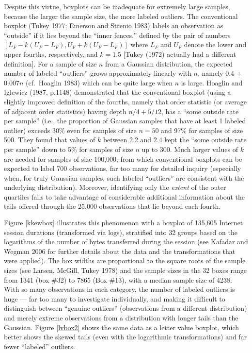 \documentclass[11pt]{article}
\begin{document}
Despite this virtue, boxplots can be inadequate for 
extremely large samples, because the larger the sample 
size, the more labeled outliers.
The conventional boxplot (Tukey 1977; Emerson and Strenio
1983) labels an observation as ``outside'' if it lies 
beyond the ``inner fences,'' defined by the pair of 
numbers $[L_F - k(U_F - L_F), U_F + k(U_F - L_F)]$ 
where $L_F$ and $U_F$ denote the lower and upper
fourths, respectively, and $k = 1.5$ [Tukey (1972)
actually had a different definition].
For a sample of size $n$ from a Gaussian distribution,
the expected number of labeled ``outliers'' grows 
approximately linearly with $n$, namely 
0.4 + 0.007$n$ 
(cf.~Hoaglin 1983) %
which can be quite large when $n$ is large.  
Hoaglin and Iglewicz (1987, p.1148) demonstrated that the
conventional boxplot (using a slightly improved definition
of the fourths, namely that order statistic (or average of
adjacent order statistics) having depth $n/4 + 5/12$,
has a ``some outside rate per sample'' (i.e., the proportion
of Gaussian samples that have at least 1 labeled outlier) 
exceeds 30\% even for samples of size $n = 50$ and 97\%
for samples of size 500.
They found that values of $k$ between 2.2 and 2.4 kept the
``some outside rate per sample'' down to 5\% for samples
of size $n$ up to 300. 
Much larger values of $k$ are needed for samples of size 
100,000, from which conventional boxplots can be expected to
label 700 observations, far too many for detailed inquiry 
(especially when, for truly Gaussian samples, such labeled 
``outliers'' are consistent with the underlying distribution).
Moreover, identifying only the \textit{extent} of the outer
quartiles fails to take advantage of considerable additional
information about the tails offered through the 25,000 
observations that lie beyond each fourth.

Figure \ref{kkewbox} illustrates this phenomenon with a boxplot 
of 135,605 Internet session durations (transformed via logs), 
stratified into 32 groups based on the logarithms of the number 
of bytes transferred during the session (see Kafadar and Wegman 2006
for further details about the data and the transformations
that were applied).  The box widths are proportional to the
square roots of the sample sizes (see Larsen, McGill, Tukey
1978) and the sample sizes in the 32 boxes range from 1341
(box \#32) to 7865 (Box \#13), with a median sample size 
of 4238. With so many observations in each category,
the number of labeled outliers is huge --- far too many to
investigate individually, and making it difficult to
distinguish between ``genuine outliers'' (observations
from a different distribution) and merely extreme observations
from a distribution with longer tails than the Gaussian.
Figure \ref{lvbox2} shows the same data as a letter value boxplot,
which better shows the skewed tails (even with the logarithmic
transformations) and far fewer ``labeled'' outliers.
\end{document}
